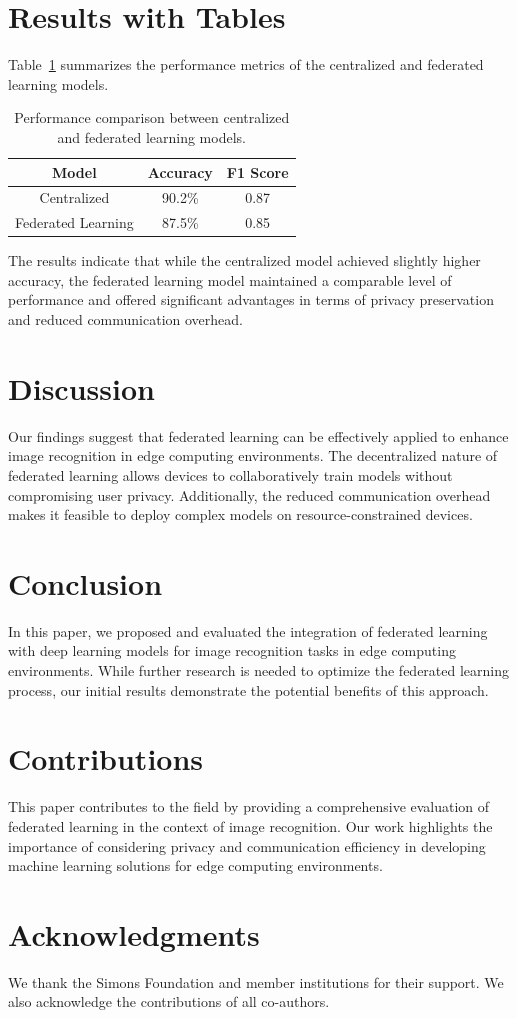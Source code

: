 \documentclass{article}
\begin{document}
\section{Results with Tables}
Table~\ref{tab:results} summarizes the performance metrics of the centralized and federated learning models.

\begin{table}[ht]
\centering
\begin{tabular}{|c|c|c|}
\hline
Model & Accuracy & F1 Score \\
\hline
Centralized & 90.2\% & 0.87 \\
Federated Learning & 87.5\% & 0.85 \\
\hline
\end{tabular}
\caption{Performance comparison between centralized and federated learning models.}
\label{tab:results}
\end{table}

The results indicate that while the centralized model achieved slightly higher accuracy, the federated learning model maintained a comparable level of performance and offered significant advantages in terms of privacy preservation and reduced communication overhead.

\section{Discussion}
Our findings suggest that federated learning can be effectively applied to enhance image recognition in edge computing environments. The decentralized nature of federated learning allows devices to collaboratively train models without compromising user privacy. Additionally, the reduced communication overhead makes it feasible to deploy complex models on resource-constrained devices.

\section{Conclusion}
In this paper, we proposed and evaluated the integration of federated learning with deep learning models for image recognition tasks in edge computing environments. While further research is needed to optimize the federated learning process, our initial results demonstrate the potential benefits of this approach.

\section{Contributions}
This paper contributes to the field by providing a comprehensive evaluation of federated learning in the context of image recognition. Our work highlights the importance of considering privacy and communication efficiency in developing machine learning solutions for edge computing environments.

\section*{Acknowledgments}
We thank the Simons Foundation and member institutions for their support. We also acknowledge the contributions of all co-authors.



\end{document}
